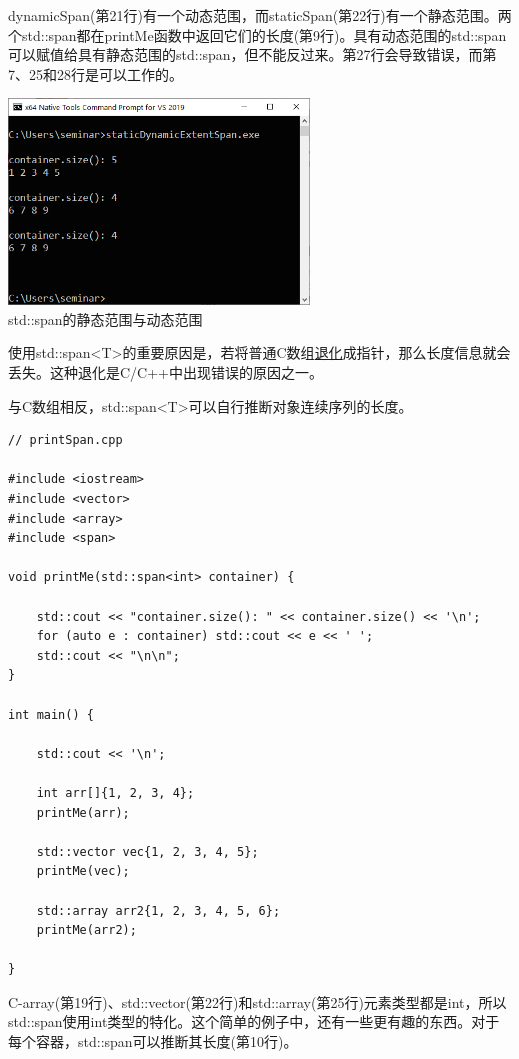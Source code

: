 dynamicSpan(第21行)有一个动态范围，而staticSpan(第22行)有一个静态范围。两个std::span都在printMe函数中返回它们的长度(第9行)。具有动态范围的std::span可以赋值给具有静态范围的std::span，但不能反过来。第27行会导致错误，而第7、25和28行是可以工作的。

\begin{center}
\includegraphics[width=0.6\textwidth]{content/3/chapter5/images/4.png}\\
std::span的静态范围与动态范围
\end{center}

使用std::span<T>的重要原因是，若将普通C数组\href{https://en.cppreference.com/w/cpp/types/decay}{退化}成指针，那么长度信息就会丢失。这种退化是C/C++中出现错误的原因之一。


与C数组相反，std::span<T>可以自行推断对象连续序列的长度。

\begin{lstlisting}[style=styleCXX]
// printSpan.cpp

#include <iostream>
#include <vector>
#include <array>
#include <span>

void printMe(std::span<int> container) {

	std::cout << "container.size(): " << container.size() << '\n';
	for (auto e : container) std::cout << e << ' ';
	std::cout << "\n\n";
}

int main() {

	std::cout << '\n';
	
	int arr[]{1, 2, 3, 4};
	printMe(arr);
	
	std::vector vec{1, 2, 3, 4, 5};
	printMe(vec);
	
	std::array arr2{1, 2, 3, 4, 5, 6};
	printMe(arr2);

}
\end{lstlisting}

C-array(第19行)、std::vector(第22行)和std::array(第25行)元素类型都是int，所以std::span使用int类型的特化。这个简单的例子中，还有一些更有趣的东西。对于每个容器，std::span可以推断其长度(第10行)。

